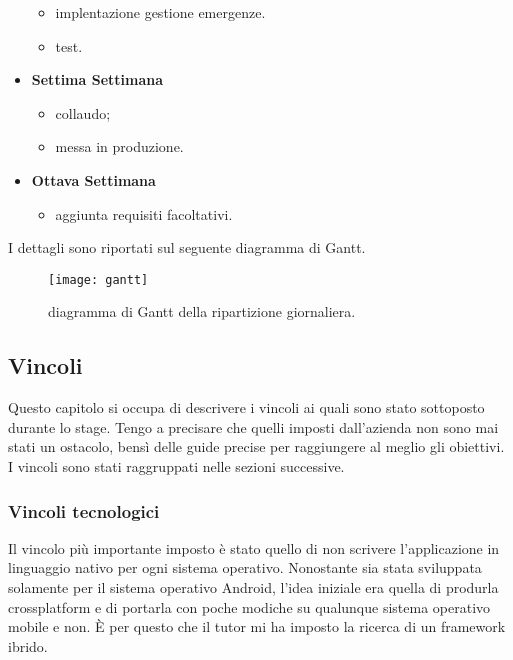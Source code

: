 \begin{itemize}
\begin{itemize}
				\item implentazione gestione emergenze.
				\item test.
		\end{itemize}
		\item \textbf{Settima Settimana}
		\begin{itemize}
				\item collaudo;
				\item messa in produzione.
		\end{itemize}
		\item \textbf{Ottava Settimana}
		\begin{itemize}
				\item aggiunta requisiti facoltativi.
		\end{itemize}
\end{itemize}

I dettagli sono riportati sul seguente \gls{diagramma di Gantt}.

\begin{figure}[h]
	\begin{center}
		\texttt{[image: gantt]}
		\caption{\Gls{diagramma di Gantt} della ripartizione giornaliera.}
	\end{center}
\end{figure}

\subsection{Vincoli}

Questo capitolo si occupa di descrivere i vincoli ai quali sono stato sottoposto durante lo stage. Tengo a precisare che quelli imposti dall'azienda non sono mai stati un ostacolo, bensì delle guide precise per raggiungere al meglio gli obiettivi. I vincoli sono stati raggruppati nelle sezioni successive.

\subsubsection{Vincoli tecnologici}
Il vincolo più importante imposto è stato quello di non scrivere l'applicazione in linguaggio nativo per ogni sistema operativo. Nonostante
sia stata sviluppata solamente per il sistema operativo Android, l'idea iniziale era quella di produrla \gls{crossplatform} e di portarla con
poche modiche su qualunque sistema operativo mobile e non. È per questo che il tutor mi ha imposto la ricerca di un framework ibrido.

